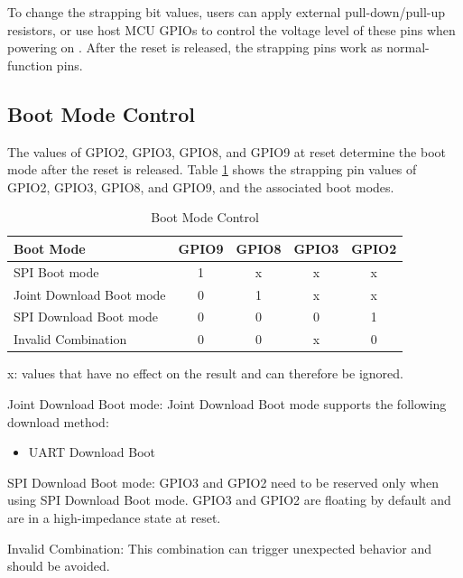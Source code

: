 \documentclass[main\_\_EN.tex]{subfiles}
\begin{document}
To change the strapping bit values, users can apply external pull-down/pull-up resistors, or use host MCU GPIOs to control the voltage level of these pins when powering on \chipname{}. After the reset is released, the strapping pins work as normal-function pins.

\subsection{Boot Mode Control}\label{sec:bootModeControl}

The values of GPIO2, GPIO3, GPIO8, and GPIO9 at reset determine the boot mode after the reset is released. Table \ref{tab:bootctrl-boot-mode-control} shows the strapping pin values of GPIO2, GPIO3, GPIO8, and GPIO9, and the associated boot modes.

\begin{table}[H]
    \centering
\caption{Boot Mode Control}
\label{tab:bootctrl-boot-mode-control}
\begin{threeparttable}
    \begin{tabular}{ | p{5cm} | c | c | c |c| }
    \hline
    \rowcolor{lightgray}
  \textbf{Boot Mode} & \textbf{GPIO9} & \textbf{GPIO8} & \textbf{GPIO3} & \textbf{GPIO2}\\ \hline
  SPI Boot mode & 1 & x\tnote{1} & x & x \\ \hline
  Joint Download Boot mode\tnote{2} & 0 & 1 & x & x\\ \hline
  SPI Download Boot mode\tnote{3} & 0 & 0 & 0 & 1 \\ \hline
  Invalid Combination\tnote{4} & 0 & 0  & x & 0 \\ \hline
\end{tabular}

\begin{tablenotes}
            \item[1] x: values that have no effect on the result and can therefore be ignored.
            \item[2] Joint Download Boot mode: Joint Download Boot mode supports the following download method:
            \begin{itemize}
                \item UART Download Boot
            \end{itemize}
            \item[3] SPI Download Boot mode: GPIO3 and GPIO2 need to be reserved only when using SPI Download Boot mode. GPIO3 and GPIO2 are floating by default and are in a high-impedance state at reset.
            \item[4] Invalid Combination: This combination can trigger unexpected behavior and should be avoided.
        \end{tablenotes}
     \end{threeparttable}
\end{table}
\end{document}
